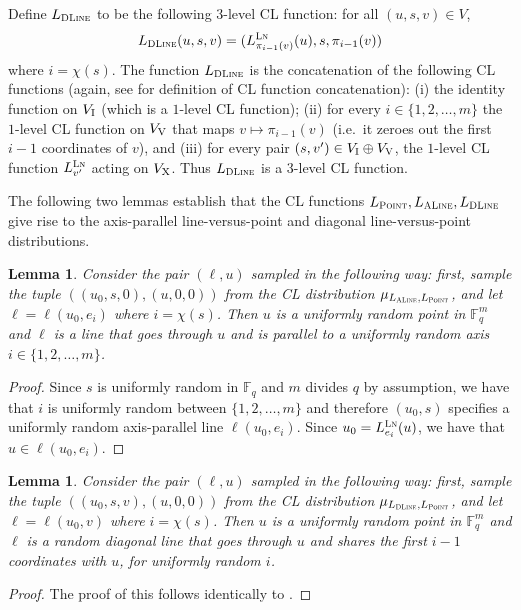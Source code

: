 \documentclass[11pt]{article}
\newtheorem{lemma}[theorem]{Lemma}
\theoremstyle{definition}
\newcommand{\F}{\ensuremath{\mathbb{F}}}
\newcommand{\labelstyle}[1]{\ensuremath{\textsc{#1}}\xspace}
\newcommand{\xpt}{\labelstyle{X}}
\newcommand{\dir}[1]{\labelstyle{V#1}}
\newcommand{\coord}{\labelstyle{I}}
\newcommand{\lnf}{\labelstyle{Ln}}
\newcommand{\typestyle}[1]{\ensuremath{\textsc{#1}}\xspace}
\renewcommand{\line}{\mathbf{\ell}}
\newcommand{\Point}{\typestyle{Point}}
\newcommand{\ALine}{\typestyle{ALine}}
\newcommand{\DLine}{\typestyle{DLine}}
\begin{document}
Define $L_\DLine$ to be the following $3$-level CL function: for all $(u,s,v) \in
V$,
\begin{equation}
\label{eq:cl-dlnf}
	L_\DLine(u,s,v) = (L^\lnf_{\pi_{i-1}(v)}(u),s,\pi_{i-1}(v))
\end{equation}
where $i = \chi(s)$.
The function $L_\DLine$ is the concatenation of the following CL functions (again, see  for definition of CL function concatenation): (i) the identity function on $V_{\coord}$ (which is a $1$-level CL function); (ii) for every $i \in \{1,2,\ldots,m\}$ the $1$-level CL function on $V_{\dir{}}$ that maps $v \mapsto \pi_{i-1}(v)$ (i.e.~it zeroes out the first $i-1$ coordinates of $v$), and (iii) for every pair $(s,v') \in V_\coord \oplus V_{\dir{}}$, the $1$-level CL function $L^\lnf_{v'}$ acting on $V_\xpt$. Thus $L_\DLine$ is a $3$-level CL function.


The following two lemmas establish that the CL functions
$L_\Point,L_\ALine,L_\DLine$ give rise to the axis-parallel line-versus-point and
diagonal line-versus-point distributions.
\begin{lemma}
	\label{lem:alnf}
	Consider the pair $(\line, u)$ sampled in the following way: first, sample the
  tuple $((u_0,s,0),(u,0,0))$ from the CL distribution $\mu_{L_\ALine,L_\Point}$,
  and let $\line = \line(u_0,e_i)$ where $i = \chi(s)$.
  Then $u$ is a uniformly random point in $\F_q^m$ and $\line$ is a line that
  goes through $u$ and is parallel to a uniformly random axis $i \in
  \{1,2,\ldots,m\}$.
\end{lemma}
\begin{proof}
	Since $s$ is uniformly random in $\F_q$ and $m$ divides $q$ by assumption, we
  have that $i$ is uniformly random between $\{1,2,\ldots,m\}$ and therefore
  $(u_0,s)$ specifies a uniformly random axis-parallel line $\line(u_0,e_i)$.
  Since $u_0 = L^{\lnf}_{e_i}(u)$, we have that $u \in \line(u_0,e_i)$.
\end{proof}



\begin{lemma}
	\label{lem:dlnf}
	Consider the pair $(\line,u)$ sampled in the following way: first, sample the
  tuple $((u_0,s,v),(u,0,0))$ from the CL distribution $\mu_{L_\DLine,L_\Point}$,
  and let $\line = \line(u_0,v)$ where $i = \chi(s)$.
  Then $u$ is a uniformly random point in $\F_q^m$ and $\line$ is a random
  diagonal line that goes through $u$ and shares the first $i-1$ coordinates
  with $u$, for uniformly random $i$.
\end{lemma}
\begin{proof}
	The proof of this follows identically to .
\end{proof}
\end{document}

